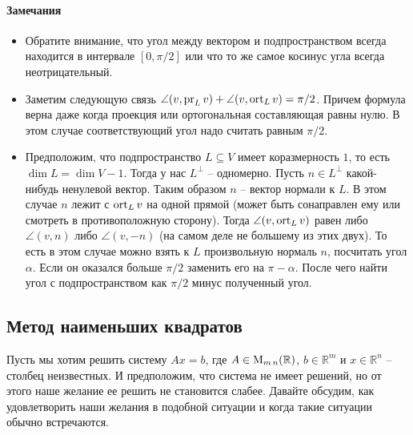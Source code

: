 \paragraph{Замечания}
\begin{itemize}
\item Обратите внимание, что угол между вектором и подпространством всегда находится в интервале $[0, \pi/2]$ или что то же самое косинус угла всегда неотрицательный.

\item Заметим следующую связь $\angle (v, \operatorname{pr}_L v) + \angle (v, \operatorname{ort}_L v) = \pi/2$. Причем формула верна даже когда проекция или ортогональная составляющая равны нулю. В этом случае соответствующий угол надо считать равным $\pi/2$.

\item Предположим, что подпространство $L\subseteq V$ имеет коразмерность $1$, то есть $\dim L = \dim V - 1$. Тогда у нас $L^\bot$ -- одномерно. Пусть $n\in L^\bot$ какой-нибудь ненулевой вектор. Таким образом $n$ -- вектор нормали к $L$. В этом случае $n$ лежит с $\operatorname{ort}_L v$ на одной прямой (может быть сонаправлен ему или смотреть в противоположную сторону). Тогда $\angle (v, \operatorname{ort}_L v)$ равен либо $\angle (v, n)$ либо $\angle (v, - n)$ (на самом деле не большему из этих двух). То есть в этом случае можно взять к $L$ произвольную нормаль $n$, посчитать угол $\alpha$. Если он оказался больше $\pi/2$ заменить его на $\pi - \alpha$. После чего найти угол с подпространством как $\pi/2$ минус полученный угол.


\end{itemize}

\subsection{Метод наименьших квадратов}

Пусть мы хотим решить систему $Ax = b$, где $A\in \operatorname{M}_{m\,n}(\mathbb R)$, $b\in \mathbb R^m$ и $x\in \mathbb R^n$ -- столбец неизвестных. И предположим, что система не имеет решений, но от этого наше желание ее решить не становится слабее. Давайте обсудим, как удовлетворить наши желания в подобной ситуации и когда такие ситуации обычно встречаются.

